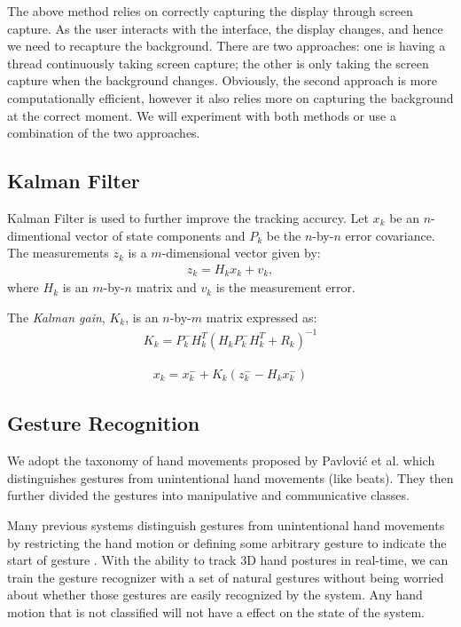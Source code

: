 The above method relies on correctly capturing the display through screen capture. As the user interacts with the interface, the display changes, and hence we need to recapture the background. There are two approaches: one is having a thread continuously taking screen capture; the other is only taking the screen capture when the background changes. Obviously, the second approach is more computationally efficient, however it also relies more on capturing the background at the correct moment. We will experiment with both methods or use a combination of the two approaches.

\subsection{Kalman Filter}
Kalman Filter is used to further improve the tracking accurcy.
Let $x_k$ be an $n$-dimentional vector of state components and $P_k$ be the
$n$-by-$n$ error covariance. The measurements $z_k$ is a $m$-dimensional
vector given by:
\begin{align*}
z_k = H_kx_k + v_k,
\end{align*}
where $H_k$ is an $m$-by-$n$ matrix and $v_k$ is the measurement error.

The \textit{Kalman gain}, $K_k$, is an $n$-by-$m$ matrix expressed as:
\begin{align*}
K_k = P_k^-H_k^T(H_kP_k^-H_k^T + R_k)^{-1}
\end{align*}

\begin{align*}
x_k = x_k^- + K_k(z_k^- - H_kx_k^-)
\end{align*}
   
\subsection{Gesture Recognition}
We adopt the taxonomy of hand movements proposed by Pavlovi\'{c} et al. \cite{Pavlovic97} which distinguishes gestures from unintentional hand movements (like beats). They then further divided the gestures into manipulative and communicative classes. 

Many previous systems distinguish gestures from unintentional hand movements by restricting the hand motion or defining some arbitrary gesture to indicate the start of gesture \cite{Shin04}. With the ability to track 3D hand postures in real-time, we can train the gesture recognizer with a set of natural gestures without being worried about whether those gestures are easily recognized by the system. Any hand motion that is not classified will not have a effect on the state of the system.

